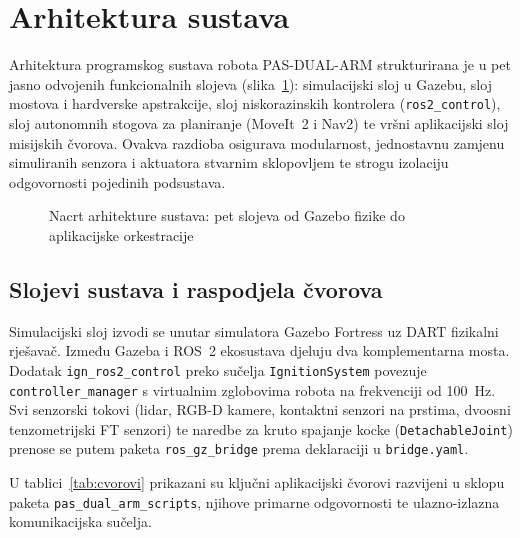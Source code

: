 \section{Arhitektura sustava}
\label{sec:02-arhitektura}

Arhitektura programskog sustava robota PAS-DUAL-ARM strukturirana je u pet jasno odvojenih
funkcionalnih slojeva (slika~\ref{fig:arh-sustava}): simulacijski sloj u Gazebu, sloj mostova i
hardverske apstrakcije, sloj niskorazinskih kontrolera (\texttt{ros2\_control}), sloj autonomnih
stogova za planiranje (MoveIt~2 i Nav2) te vršni aplikacijski sloj misijskih čvorova. Ovakva
razdioba osigurava modularnost, jednostavnu zamjenu simuliranih senzora i aktuatora stvarnim
sklopovljem te strogu izolaciju odgovornosti pojedinih podsustava.

\begin{figure}[H]
  \centering
  
  \caption{Nacrt arhitekture sustava: pet slojeva od Gazebo fizike do aplikacijske orkestracije}
  \label{fig:arh-sustava}
\end{figure}

\subsection{Slojevi sustava i raspodjela čvorova}
\label{sec:02-slojevi}

Simulacijski sloj izvodi se unutar simulatora Gazebo Fortress uz DART fizikalni rješavač.
Između Gazeba i ROS~2 ekosustava djeluju dva komplementarna mosta. Dodatak \texttt{ign\_ros2\_control}
\cite{mail2026} preko sučelja \texttt{IgnitionSystem} povezuje \texttt{controller\_manager}
s virtualnim zglobovima robota na frekvenciji od 100~Hz. Svi senzorski tokovi (lidar, RGB-D kamere,
kontaktni senzori na prstima, dvoosni tenzometrijski FT senzori) te naredbe za kruto spajanje
kocke (\texttt{DetachableJoint}) prenose se putem paketa \texttt{ros\_gz\_bridge} prema
deklaraciji u \texttt{bridge.yaml}.

U tablici~\ref{tab:cvorovi} prikazani su ključni aplikacijski čvorovi razvijeni u sklopu paketa
\texttt{pas\_dual\_arm\_scripts}, njihove primarne odgovornosti te ulazno-izlazna komunikacijska sučelja.

